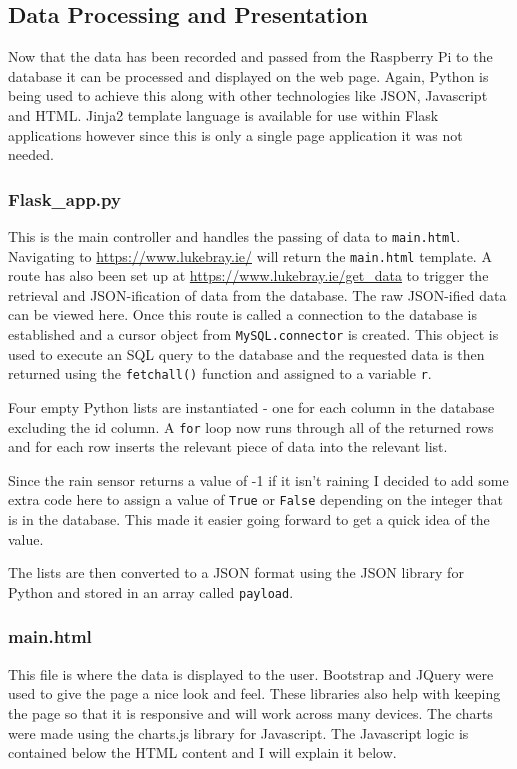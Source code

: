 \documentclass[10pt,a4paper]{article}
\begin{document}
\subsection{Data Processing and Presentation}
Now that the data has been recorded and passed from the Raspberry Pi to the database it can be processed and displayed on the web page. Again, Python is being used to achieve this along with other technologies like JSON, Javascript and HTML. Jinja2 template language is available for use within Flask applications however since this is only a single page application it was not needed. 

\subsubsection{Flask\_app.py}
This is the main controller and handles the passing of data to \texttt{main.html}. Navigating to \url{https://www.lukebray.ie/} will return the \texttt{main.html} template. A route has also been set up at \url{https://www.lukebray.ie/get_data} to trigger the retrieval and JSON-ification of data from the database. The raw JSON-ified data can be viewed here. Once this route is called a connection to the database is established and a cursor object from \texttt{MySQL.connector} is created. This object is used to execute an SQL query to the database and the requested data is then returned using the \texttt{fetchall()} function and assigned to a variable \texttt{r}. 

Four empty Python lists are instantiated - one for each column in the database excluding the id column. A \texttt{for} loop now runs through all of the returned rows and for each row inserts the relevant piece of data into the relevant list. 

Since the rain sensor returns a value of -1 if it isn't raining I decided to add some extra code here to assign a value of \texttt{True} or \texttt{False} depending on the integer that is in the database. This made it easier going forward to get a quick idea of the value. 

The lists are then converted to a JSON format using the JSON library for Python and stored in an array called \texttt{payload}. 

\subsubsection{main.html}
This file is where the data is displayed to the user. Bootstrap and JQuery were used to give the page a nice look and feel. These libraries also help with keeping the page so that it is responsive and will work across many devices. The charts were made using the charts.js library for Javascript. The Javascript logic is contained below the HTML content and I will explain it below. 
\end{document}
